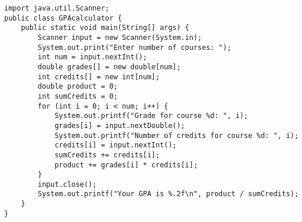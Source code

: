 \begin{lstlisting}
import java.util.Scanner;
public class GPAcalculator {
	public static void main(String[] args) {
		Scanner input = new Scanner(System.in);
		System.out.print("Enter number of courses: ");
		int num = input.nextInt();
		double grades[] = new double[num];
		int credits[] = new int[num];
		double product = 0;
		int sumCredits = 0;
		for (int i = 0; i < num; i++) {
			System.out.printf("Grade for course %d: ", i);
			grades[i] = input.nextDouble();
			System.out.printf("Number of credits for course %d: ", i);
			credits[i] = input.nextInt();
			sumCredits += credits[i];
			product += grades[i] * credits[i];
		}
		input.close();
		System.out.printf("Your GPA is %.2f\n", product / sumCredits);
	}
}
\end{lstlisting}
